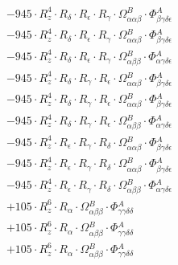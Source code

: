 \documentclass{article}
\begin{document}
\begin{subequations}
\begin{gather}
\begin{array}{c}
 \\[0.2em] 		 - 945 \cdot R_{z}^{4} \cdot R_{\delta{}} \cdot R_{\epsilon{}} \cdot R_{\gamma{}} \cdot \Omega{}^{B}_{\alpha{}\alpha{}\beta{}} \cdot \Phi{}^{A}_{\beta{}\gamma{}\delta{}\epsilon{}} 
 \\[0.2em] 		 - 945 \cdot R_{z}^{4} \cdot R_{\delta{}} \cdot R_{\epsilon{}} \cdot R_{\gamma{}} \cdot \Omega{}^{B}_{\alpha{}\alpha{}\beta{}} \cdot \Phi{}^{A}_{\beta{}\gamma{}\delta{}\epsilon{}} 
 \\[0.2em] 		 - 945 \cdot R_{z}^{4} \cdot R_{\delta{}} \cdot R_{\epsilon{}} \cdot R_{\gamma{}} \cdot \Omega{}^{B}_{\alpha{}\beta{}\beta{}} \cdot \Phi{}^{A}_{\alpha{}\gamma{}\delta{}\epsilon{}} 
 \\[0.2em] 		 - 945 \cdot R_{z}^{4} \cdot R_{\delta{}} \cdot R_{\gamma{}} \cdot R_{\epsilon{}} \cdot \Omega{}^{B}_{\alpha{}\alpha{}\beta{}} \cdot \Phi{}^{A}_{\beta{}\gamma{}\delta{}\epsilon{}} 
 \\[0.2em] 		 - 945 \cdot R_{z}^{4} \cdot R_{\delta{}} \cdot R_{\gamma{}} \cdot R_{\epsilon{}} \cdot \Omega{}^{B}_{\alpha{}\alpha{}\beta{}} \cdot \Phi{}^{A}_{\beta{}\gamma{}\delta{}\epsilon{}} 
 \\[0.2em] 		 - 945 \cdot R_{z}^{4} \cdot R_{\delta{}} \cdot R_{\gamma{}} \cdot R_{\epsilon{}} \cdot \Omega{}^{B}_{\alpha{}\beta{}\beta{}} \cdot \Phi{}^{A}_{\alpha{}\gamma{}\delta{}\epsilon{}} 
 \\[0.2em] 		 - 945 \cdot R_{z}^{4} \cdot R_{\epsilon{}} \cdot R_{\gamma{}} \cdot R_{\delta{}} \cdot \Omega{}^{B}_{\alpha{}\alpha{}\beta{}} \cdot \Phi{}^{A}_{\beta{}\gamma{}\delta{}\epsilon{}} 
 \\[0.2em] 		 - 945 \cdot R_{z}^{4} \cdot R_{\epsilon{}} \cdot R_{\gamma{}} \cdot R_{\delta{}} \cdot \Omega{}^{B}_{\alpha{}\alpha{}\beta{}} \cdot \Phi{}^{A}_{\beta{}\gamma{}\delta{}\epsilon{}} 
 \\[0.2em] 		 - 945 \cdot R_{z}^{4} \cdot R_{\epsilon{}} \cdot R_{\gamma{}} \cdot R_{\delta{}} \cdot \Omega{}^{B}_{\alpha{}\beta{}\beta{}} \cdot \Phi{}^{A}_{\alpha{}\gamma{}\delta{}\epsilon{}} 
 \\[0.2em] 		 + 105 \cdot R_{z}^{6} \cdot R_{\alpha{}} \cdot \Omega{}^{B}_{\alpha{}\beta{}\beta{}} \cdot \Phi{}^{A}_{\gamma{}\gamma{}\delta{}\delta{}} 
 \\[0.2em] 		 + 105 \cdot R_{z}^{6} \cdot R_{\alpha{}} \cdot \Omega{}^{B}_{\alpha{}\beta{}\beta{}} \cdot \Phi{}^{A}_{\gamma{}\gamma{}\delta{}\delta{}} 
 \\[0.2em] 		 + 105 \cdot R_{z}^{6} \cdot R_{\alpha{}} \cdot \Omega{}^{B}_{\alpha{}\beta{}\beta{}} \cdot \Phi{}^{A}_{\gamma{}\gamma{}\delta{}\delta{}} 

\end{array}
\end{gather}
\end{subequations}
\end{document}

